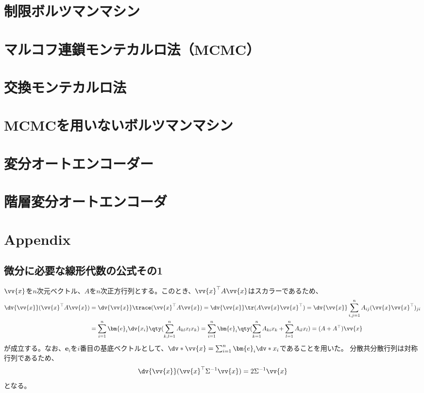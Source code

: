 \documentclass[a4paper,11pt,uplatex]{jsarticle}%
\begin{document}
\section{制限ボルツマンマシン}

\section{マルコフ連鎖モンテカルロ法（MCMC）}

\section{交換モンテカルロ法}

\section{MCMCを用いないボルツマンマシン}

\section{変分オートエンコーダー}

\section{階層変分オートエンコーダ}

\section{Appendix}

\subsection{微分に必要な線形代数の公式その1}
$\vv{x}$を$n$次元ベクトル、$A$を$n$次正方行列とする。このとき、$\vv{x}^{\top}A\vv{x}$はスカラーであるため、
\begin{align}
  \dv{\vv{x}}(\vv{x}^{\top}A\vv{x}) & = \dv{\vv{x}}\trace(\vv{x}^{\top}A\vv{x}) = \dv{\vv{x}}\tr(A\vv{x}\vv{x}^{\top})
  = \dv{\vv{x}}\sum_{i,j=1}^{n}A_{ij}(\vv{x}\vv{x}^{\top})_{ji} \notag                                                 \\
                                    & = \sum_{i=1}^{n}\bm{e}_{i}\dv{x_i}\qty(\sum_{k,l=1}^{n}A_{kl}x_lx_k)
  = \sum_{i=1}^{n}\bm{e}_{i}\qty(\sum_{k=1}^{n}A_{ki}x_k + \sum_{l=1}^{n}A_{il}x_l) = (A+A^{\top})\vv{x}
\end{align}
が成立する。なお、$\bm{e}_i$を$i$番目の基底ベクトルとして、$\dv*{\vv{x}} = \sum_{i=1}^{n}\bm{e}_i\dv*{x_i}$であることを用いた。
分散共分散行列は対称行列であるため、
\begin{equation}
  \dv{\vv{x}}(\vv{x}^{\top}\Sigma^{-1}\vv{x}) = 2\Sigma^{-1}\vv{x}
\end{equation}
となる。
\end{document}
